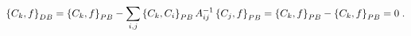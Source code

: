 \begin{equation}
\left\{  C_{k},f\right\}  _{{\footnotesize DB}}=\left\{  C_{k},f\right\}
_{{\footnotesize PB}}-\sum_{i,j}\left\{  C_{k},C_{i}\right\}
_{{\footnotesize PB}}A_{ij}^{-1}\left\{  C_{j},f\right\}  _{{\footnotesize PB}%
}=\left\{  C_{k},f\right\}  _{{\footnotesize PB}}-\left\{  C_{k},f\right\}
_{{\footnotesize PB}}=0\;.
\end{equation}

